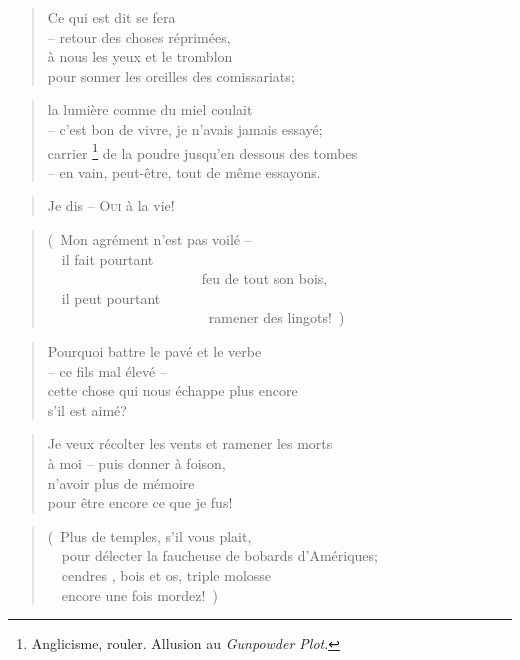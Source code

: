   \begin{verse}
    Ce qui est dit se fera\\
    -- retour des choses réprimées,\\
    à nous les yeux et le tromblon\\
    pour sonner les oreilles des comissariats;
  \end{verse}
  \begin{verse}
    la lumière comme du miel coulait\\
    -- c’est bon de vivre, je n’avais jamais essayé;\\
    carrier
      \footnote{Anglicisme, rouler. Allusion au \emph{Gunpowder Plot}.}
    de la poudre jusqu’en dessous des tombes\\
    -- en vain, peut-être, tout de même essayons.
  \end{verse}
  \begin{verse}
    Je dis -- \textsc{Oui} à la vie!
  \end{verse}
  \begin{verse}
    (~Mon agrément n’est pas voilé --\\
    ~~il fait pourtant\\
    ~~~~~~~~~~~~~~~~~~~~~~feu de tout son bois,\\
    ~~il peut pourtant\\
    ~~~~~~~~~~~~~~~~~~~~~~~ramener des lingots!~)
  \end{verse}
  \begin{verse}
    Pourquoi battre le pavé et le verbe\\
    -- ce fils mal élevé --\\
    cette chose qui nous échappe plus encore\\
    s’il est aimé?
  \end{verse}
  \begin{verse}
    Je veux récolter les vents et ramener les morts\\
    à moi -- puis donner à foison,\\
    n’avoir plus de mémoire\\
    pour être encore ce que je fus!
  \end{verse}
  \begin{verse}
    (~Plus de temples, s’il vous plait,\\
    ~~pour délecter la faucheuse de bobards d’Amériques;\\
    ~~cendres , bois et os, triple molosse\\
    ~~encore une fois mordez!~)
  \end{verse}
